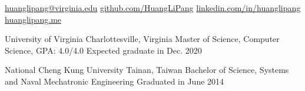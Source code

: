 \documentclass[10pt,letterpaper]{article}
\begin{document}
\sloppy  %


\nobreakvspace{0.3em}  %

\noindent\href{mailto:lh5jv@virginia.edu}{huanglipang\mbox{}@\mbox{}virginia.edu}\sbull
\href{https://github.com/HuangLiPang/}{github.com/HuangLiPang}\sbull
\href{https://www.linkedin.com/in/huanglipang/}{linkedin.com/in/huanglipang}\sbull
\href{https://huanglipang.me}{huanglipang.me}
\spacedhrule{0.5em}{-0.6em}  %




\headedsection
  {University of Virginia}
  {Charlottesville, Virginia} {
  \headedsubsection
    {Master of Science, Computer Science, GPA: 4.0/4.0}
    {Expected graduate in Dec. 2020}
    {
    }
}

\vspace{0.5em}

\headedsection
  {National Cheng Kung University}
  {Tainan, Taiwan} {%
  \headedsubsection
    {Bachelor of Science, Systems and Naval Mechatronic Engineering}
    {Graduated in June 2014}
    {}
}
\end{document}
